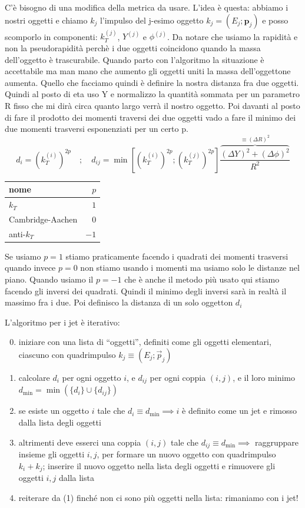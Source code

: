 \documentclass[11pt]{article}
\begin{document}
C'è bisogno di una modifica della metrica da usare. L'idea è questa: abbiamo i nostri oggetti e chiamo $k_j$ l'impulso del j-esimo oggetto $k_j=(E_j;\mathbf{p}_j)$ e posso scomporlo in componenti: $k_T^{(j)}$, $Y^{(j)}$ e $\phi^{(j)}$. Da notare che usiamo la rapidità e non la pseudorapidità perchè i due oggetti coincidono quando la massa dell'oggetto è trascurabile. Quando parto con l'algoritmo la situazione è accettabile ma man mano che aumento gli oggetti uniti la massa dell'oggettone aumenta. Quello che facciamo quindi è definire la nostra distanza fra due oggetti. Quindi al posto di eta uso Y e normalizzo la quantità sommata per un parametro R fisso che mi dirà circa quanto largo verrà il nostro oggetto. Poi davanti al posto di fare il prodotto dei momenti traversi dei due oggetti vado a fare il minimo dei due momenti trasversi esponenziati per un certo p.
\begin{equation*}
    d_i = \left(k_T^{(i)}\right)^{2p} \quad ; \quad
    d_{ij} = \min \left[ \left(k_T^{(i)}\right)^{2p} ; \left(k_T^{(j)}\right)^{2p} \right] \frac{\overbrace{(\Delta Y)^2 + (\Delta\phi)^2}^{\equiv (\Delta R)^2}}{R^2}
\end{equation*}
\begin{center}
\begin{tabular}{l|r}
    nome & $p$ \\
    \hline
    $k_T$ & $1$ \\
    Cambridge-Aachen & $0$ \\
    anti-$k_T$ & $-1$
\end{tabular}
\end{center}
Se usiamo $p = 1$ stiamo praticamente facendo i quadrati dei momenti trasversi quando invece $p = 0$ non stiamo usando i momenti ma usiamo solo le distanze nel piano. Quando usiamo il $p = -1$ che è anche il metodo più usato qui stiamo facendo gli inversi dei quadrati. Quindi il minimo degli inversi sarà in realtà il massimo fra i due. Poi definisco la distanza di un solo oggetton $d_i$

\noindent L'algoritmo per i jet è iterativo:
\begin{enumerate}
    \setcounter{enumi}{-1}
    \item iniziare con una lista di ``oggetti'', definiti come gli oggetti elementari, ciascuno con quadrimpulso $k_j \equiv (E_j; \vec{p}_j)$
    \item calcolare $d_i$ per ogni oggetto $i$, e $d_{ij}$ per ogni coppia $(i,j)$, e il loro minimo $d_{\min} = \min(\{d_i\} \cup \{d_{ij}\})$
    \item se esiste un oggetto $i$ tale che $d_i \equiv d_{\min} \implies i$ è definito come un jet e rimosso dalla lista degli oggetti
    \item altrimenti deve esserci una coppia $(i,j)$ tale che $d_{ij} \equiv d_{\min} \implies$ raggruppare insieme gli oggetti $i,j$, per formare un nuovo oggetto con quadrimpulso $k_i + k_j$; inserire il nuovo oggetto nella lista degli oggetti e rimuovere gli oggetti $i,j$ dalla lista
    \item reiterare da (1) finché non ci sono più oggetti nella lista: rimaniamo con i jet!
\end{enumerate}
\end{document}

